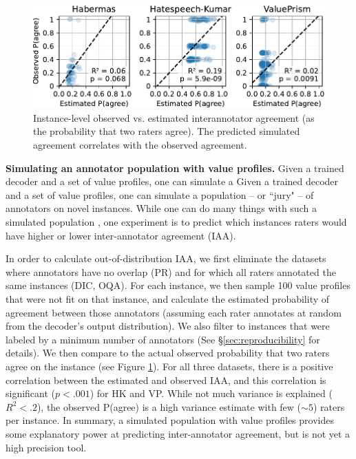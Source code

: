 \documentclass[11pt]{article}
\begin{document}
\begin{figure}
\centering
\small
\includegraphics[width=0.8\columnwidth]{files/agreement.pdf}
\caption{Instance-level observed vs. estimated interannotator agreement (as the probability that two raters agree).
The predicted simulated agreement correlates with the observed agreement.
}
\label{fig:agreement}
\vspace{-10pt}
\end{figure}

\textbf{Simulating an annotator population with value profiles.}
Given a trained decoder and a set of value profiles, one can simulate a 
Given a trained decoder and a set of value profiles, one can simulate a population -- or ``jury" \citep{Gordon_2022} -- of annotators on novel instances. While one can do many things with such a simulated population \citep{park2023generativeagentsinteractivesimulacra, Gordon_2022}, one experiment is to predict which instances raters would have higher or lower inter-annotator agreement (IAA).

In order to calculate out-of-distribution IAA, we first eliminate the datasets where annotators have no overlap (PR) and for which all raters annotated the same instances (DIC, OQA). For each instance, we then sample 100 value profiles that were not fit on that instance, and calculate the estimated probability of agreement between those annotators (assuming each rater annotates at random from the decoder's output distribution). We also filter to instances that were labeled by a minimum number of annotators (See \S\ref{sec:reproducibility} for details). We then compare to the actual observed probability that two raters agree on the instance (see Figure \ref{fig:agreement}). For all three datasets, there is a positive correlation between the estimated and observed IAA, and this correlation is significant ($p<.001$) for HK and VP. While not much variance is explained ($R^2 < .2$), the observed P(agree) is a high variance estimate with few ($\sim 5$) raters per instance. In summary, a simulated population with value profiles provides some explanatory power at predicting inter-annotator agreement, but is not yet a high precision tool.
\end{document}
